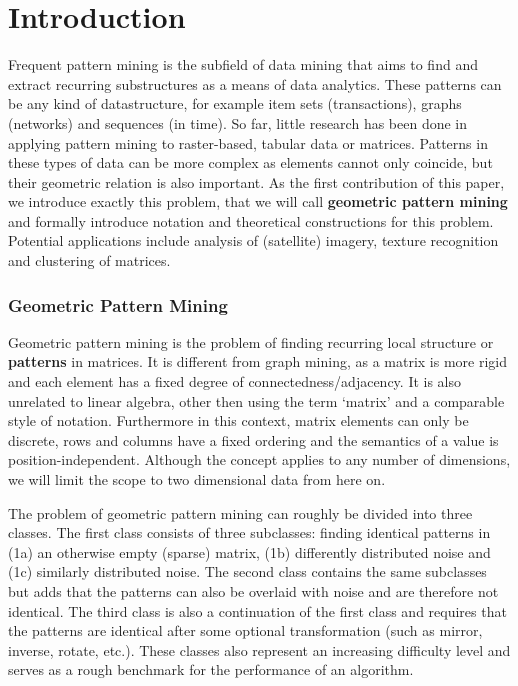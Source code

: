 \documentclass{llncs}
\begin{document}
\section{Introduction}

Frequent pattern mining is the subfield of data mining that aims to find and extract recurring substructures as a means of data analytics. These patterns can be any kind of datastructure, for example item sets (transactions), graphs (networks) and sequences (in time). So far, little research has been done in applying pattern mining to raster-based, tabular data or matrices. Patterns in these types of data can be more complex as elements cannot only coincide, but their geometric relation is also important. As the first contribution of this paper, we introduce exactly this problem, that we will call \textbf{geometric pattern mining} and formally introduce notation and theoretical constructions for this problem. Potential applications include analysis of (satellite) imagery, texture recognition and clustering of matrices.

\subsubsection{Geometric Pattern Mining}

Geometric pattern mining is the problem of finding recurring local structure or \textbf{patterns} in matrices. It is different from graph mining, as a matrix is more rigid and each element has a fixed degree of connectedness/adjacency. It is also unrelated to linear algebra, other then using the term `matrix' and a comparable style of notation. Furthermore in this context, matrix elements can only be discrete, rows and columns have a fixed ordering and the semantics of a value is position-independent. Although the concept applies to any number of dimensions, we will limit the scope to two dimensional data from here on.

The problem of geometric pattern mining can roughly be divided into three classes. The first class consists of three subclasses: finding identical patterns in (1a) an otherwise empty (sparse) matrix, (1b) differently distributed noise and (1c) similarly distributed noise. The second class contains the same subclasses but adds that the patterns can also be overlaid with noise and are therefore not identical. The third class is also a continuation of the first class and requires that the patterns are identical after some optional transformation (such as mirror, inverse, rotate, etc.). These classes also represent an increasing difficulty level and serves as a rough benchmark for the performance of an algorithm. 
\end{document}
